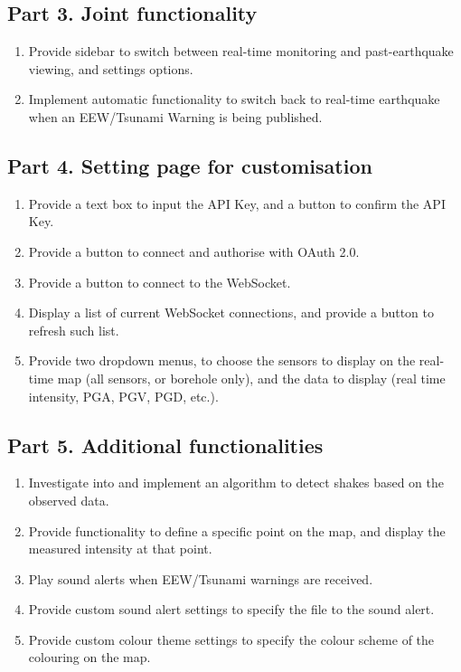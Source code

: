 \subsection{Part 3. Joint functionality}
\begin{enumerate}
    \item Provide sidebar to switch between real-time monitoring and past-earthquake viewing, and settings options.
    \item Implement automatic functionality to switch back to real-time earthquake when an EEW/Tsunami Warning is being published.
\end{enumerate}

\subsection{Part 4. Setting page for customisation}
\begin{enumerate}
    \item Provide a text box to input the API Key, and a button to confirm the API Key.
    \item Provide a button to connect and authorise with OAuth 2.0.
    \item Provide a button to connect to the WebSocket.
    \item Display a list of current WebSocket connections, and provide a button to refresh such list.
    \item Provide two dropdown menus, to choose the sensors to display on the real-time map (all sensors, or borehole only), and the data to display (real time intensity, PGA, PGV, PGD, etc.).
\end{enumerate}

\subsection{Part 5. Additional functionalities}
\begin{enumerate}
    \item Investigate into and implement an algorithm to detect shakes based on the observed data.
    \item Provide functionality to define a specific point on the map, and display the measured intensity at that point.
    \item Play sound alerts when EEW/Tsunami warnings are received.
    \item Provide custom sound alert settings to specify the file to the sound alert.
    \item Provide custom colour theme settings to specify the colour scheme of the colouring on the map.
\end{enumerate}

